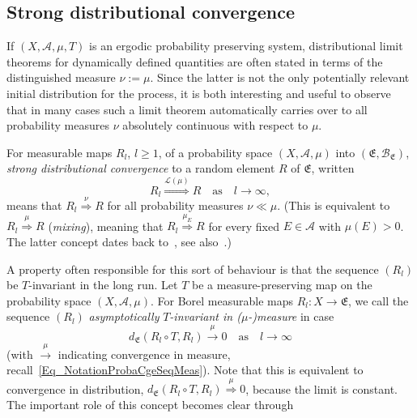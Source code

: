 \documentclass[10pt]{amsart}
\theoremstyle{definition}\newtheorem{defi}[theo]{Definition}\newtheorem{rema}[theo]{Remark}\newtheorem{exam}[theo]{Example}\newtheorem{exem}[theo]{Example}\newtheorem{nota}[theo]{Notation}
\newcommand{\clA}{\mathcal{A}}
\newcommand{\clB}{\mathcal{B}}
\newcommand{\clL}{\mathcal{L}}
\newcommand{\frkE}{\mathfrak{E}}
\begin{document}
\subsection{Strong distributional convergence}
If $(X,\clA,\mu,T)$ is an ergodic probability preserving system, distributional limit theorems for dynamically defined quantities are often stated in terms of the distinguished measure $\nu:=\mu$. Since the latter is not the only potentially relevant initial distribution for the process, it is both interesting and useful to observe that in many cases such a limit theorem automatically carries over to all probability measures $\nu$ absolutely continuous with respect to $\mu$.

For measurable maps $R_{l}$, $l\geq1$, of a probability space $(X,\clA,\mu)$ into $(\frkE,\clB_{\frkE})$, \emph{strong distributional convergence} to a random element $R$ of $\frkE$, written
\begin{equation}
R_{l}\overset{\clL(\mu)}{\Longrightarrow}R \quad \text{as}\quad l\rightarrow\infty,
\end{equation}
means that $R_{l}\overset{\nu}{\Longrightarrow}R$ for all probability measures $\nu\ll\mu$. (This is equivalent to $R_{l}\overset{\mu}{\Longrightarrow}R$ (\emph{mixing}), meaning that $R_{l}\overset{\mu_{E}}{\Longrightarrow}R$ for every fixed $E\in\clA$ with $\mu(E)>0$. The latter concept dates back to~\cite{Renyi}, see also~\cite{Ea}.)


A property often responsible for this sort of behaviour is that the sequence $(R_{l})$ be $T$-invariant in the long run. Let $T$ be a measure-preserving map on the probability space $(X,\clA,\mu)$. For Borel measurable maps $R_{l}:X\rightarrow\frkE$, we call the sequence $(R_{l})$
\emph{asymptotically }$T$\emph{-invariant in (}$\mu$\emph{-)measure} in case
\begin{equation}\label{Eq_AsyTInvar}
d_{\frkE}\left(R_{l}\circ T,R_{l}\right)\overset{\mu}{\longrightarrow}0\quad\text{as}\quad l\rightarrow\infty
\end{equation}
(with $\overset{\mu}{\longrightarrow}$ indicating convergence in measure, recall~\eqref{Eq_NotationProbaCgeSeqMeas}). Note that this is equivalent to convergence in distribution, $d_{\frkE}(R_{l}\circ T,R_{l})\overset {\mu}{\Longrightarrow}0$, because the limit is constant. The important role of this concept becomes clear through
\end{document}
